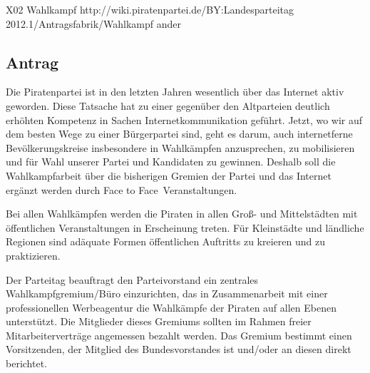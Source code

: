 \sonstigerantrag
{X02}
{Wahlkampf}
{http://wiki.piratenpartei.de/BY:Landesparteitag 2012.1/Antragsfabrik/Wahlkampf}
{ander}

\subsection{Antrag}
Die Piratenpartei ist in den letzten Jahren wesentlich über das Internet aktiv geworden. Diese
Tatsache hat zu einer gegenüber den Altparteien deutlich erhöhten Kompetenz in Sachen
Internetkommunikation geführt. Jetzt, wo wir auf dem besten Wege zu einer Bürgerpartei sind, geht
es darum, auch internetferne Bevölkerungskreise insbesondere in Wahlkämpfen anzusprechen, zu
mobilisieren und für Wahl unserer Partei und Kandidaten zu gewinnen. Deshalb soll die
Wahlkampfarbeit über die bisherigen Gremien der Partei und das Internet ergänzt werden durch
\glqq Face to Face\grqq\  Veranstaltungen.\par
Bei allen Wahlkämpfen werden die Piraten in allen Groß- und Mittelstädten mit öffentlichen
Veranstaltungen in Erscheinung treten. Für Kleinstädte und ländliche Regionen sind adäquate
Formen öffentlichen Auftritts zu kreieren und zu praktizieren.\par
Der Parteitag beauftragt den Parteivorstand ein zentrales Wahlkampfgremium/Büro einzurichten,
das in Zusammenarbeit mit einer professionellen Werbeagentur die Wahlkämpfe der Piraten auf
allen Ebenen unterstützt. Die Mitglieder dieses Gremiums sollten im Rahmen freier
Mitarbeiterverträge angemessen bezahlt werden. Das Gremium bestimmt einen Vorsitzenden, der
Mitglied des Bundesvorstandes ist und/oder an diesen direkt berichtet.
